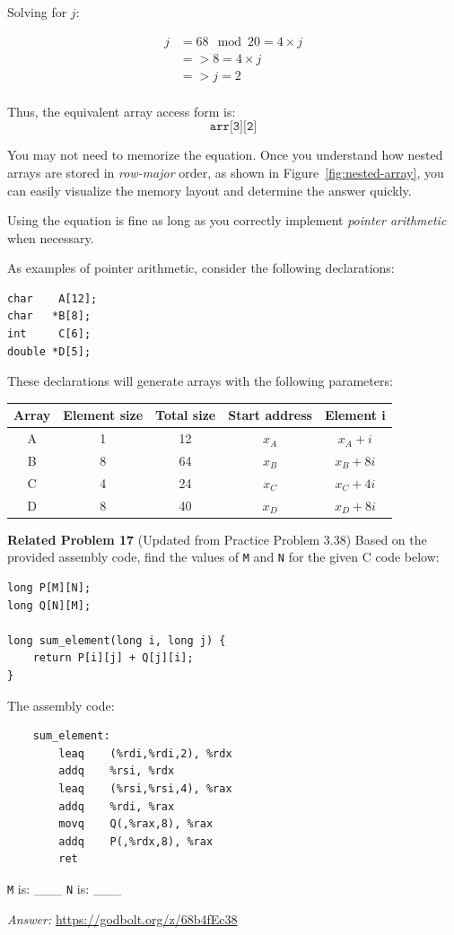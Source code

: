 Solving for \( j \):

\begin{align*}
j &= 68 \mod 20 = 4 \times j \\
  &=> 8 = 4 \times j \\
  &=> j = 2 \\
\end{align*}

Thus, the equivalent array access form is:
\[
\texttt{arr[3][2]}
\]

You may not need to memorize the equation. Once you understand how nested arrays are stored in \textit{row-major} order, as shown in Figure~\ref{fig:nested-array}, you can easily visualize the memory layout and determine the answer quickly. 

Using the equation is fine as long as you correctly implement \textit{pointer arithmetic} when necessary.

As examples of pointer arithmetic, consider the following declarations:

\begin{verbatim}
char    A[12];
char   *B[8];
int     C[6];
double *D[5];
\end{verbatim}

These declarations will generate arrays with the following parameters:
\begin{table}[h]
    \centering
    \begin{tabular}{c c c c c}
        \toprule
        \textbf{Array} & \textbf{Element size} & \textbf{Total size} & \textbf{Start address} & \textbf{Element i} \\ %
        \midrule
        A & 1  & 12  & \( x_A \)  & \( x_A + i \) \\ %
        B & 8  & 64  & \( x_B \)  & \( x_B + 8i \) \\ 
        C & 4  & 24  & \( x_C \)  & \( x_C + 4i \) \\ 
        D & 8  & 40  & \( x_D \)  & \( x_D + 8i \) \\ 
        \bottomrule
    \end{tabular}
\end{table}

\noindent\textbf{Related Problem 17} (Updated from Practice Problem 3.38) 
Based on the provided assembly code, find the values of \texttt{M} and \texttt{N} for the given C code below:
\begin{verbatim}
long P[M][N];
long Q[N][M];

long sum_element(long i, long j) {
    return P[i][j] + Q[j][i];
}
\end{verbatim}
The assembly code:
\begin{verbatim}
    sum_element:
        leaq    (%rdi,%rdi,2), %rdx
        addq    %rsi, %rdx
        leaq    (%rsi,%rsi,4), %rax
        addq    %rdi, %rax
        movq    Q(,%rax,8), %rax
        addq    P(,%rdx,8), %rax
        ret
\end{verbatim}

\texttt{M} is: \_\_\_ \newline
\texttt{N} is: \_\_\_ 

\textit{Answer: }\url{https://godbolt.org/z/68b4fEc38} 
\clearpage